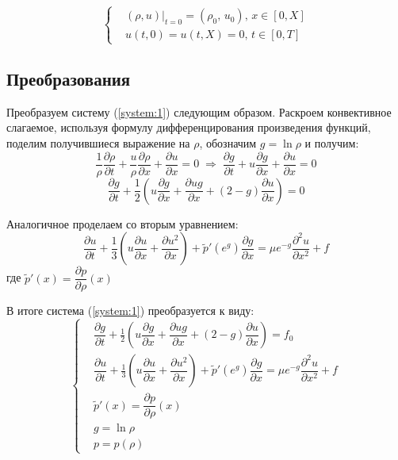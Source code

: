 \begin{equation}
\label{system:2}
\left\{
 \begin{aligned}
  & (\rho, u)|_{t = 0} =
    (\rho_{0}, \,u_{0}), \,  
    x \in [0, X] \\
  & u(t, 0) = u(t, X) = 0, \,
    t \in [0, T] 
 \end{aligned}
\right.
\end{equation}


\subsection{Преобразования}
Преобразуем систему (\ref{system:1}) следующим образом. Раскроем конвективное слагаемое, используя формулу дифференцирования произведения функций, поделим получившиеся выражение на $\rho$, обозначим $g = \ln \rho$ и получим:
$$
  \frac{1}{\rho} \dfrac{\partial \rho}{\partial t} 
  + \frac{u}{\rho} \dfrac{\partial \rho}{\partial x} 
  + \dfrac{\partial u}{\partial x} = 0 
  \;\Rightarrow\;
  \dfrac{\partial g}{\partial t} 
  + u \dfrac{\partial g}{\partial x} 
  + \dfrac{\partial u}{\partial x} = 0 
$$$$
  \dfrac{\partial g}{\partial t} 
  + \frac{1}{2} \left(
    u \dfrac{\partial g}{\partial x} 
    + \dfrac{\partial ug}{\partial x} 
    + (2 - g)\dfrac{\partial u}{\partial x}
  \right) = 0 
$$

Аналогичное проделаем со вторым уравнением:
$$
  \dfrac{\partial u}{\partial t} 
  + \frac{1}{3} \left(
    u \dfrac{\partial u}{\partial x} 
    + \dfrac{\partial u^2}{\partial x} 
  \right) 
  + \tilde{p}'(e^{g}) \dfrac{\partial g}{\partial x} 
  = \mu e^{-g} \dfrac{\partial^2 u}{\partial x^2} + f
$$
где  $\tilde{p}'(x) = \dfrac{\partial p}{\partial \rho}(x)$

В итоге система (\ref{system:1}) преобразуется к виду:
\begin{equation}
\label{system:3}
\left\{
 \begin{aligned}
  & \dfrac{\partial g}{\partial t} 
    + \frac{1}{2} \left(
      u \dfrac{\partial g}{\partial x} 
      + \dfrac{\partial ug}{\partial x} 
      + (2 - g)\dfrac{\partial u}{\partial x}
    \right) = f_0  \\
  & \dfrac{\partial u}{\partial t} 
    + \frac{1}{3} \left(
      u \dfrac{\partial u}{\partial x} 
      + \dfrac{\partial u^2}{\partial x} 
    \right) 
    + \tilde{p}'(e^{g}) \dfrac{\partial g}{\partial x} 
    = \mu e^{-g} \dfrac{\partial^2 u}{\partial x^2} + f \\
  & \tilde{p}'(x) = \dfrac{\partial p}{\partial \rho}(x) \\
  & g = \ln \rho \\
  & p = p (\rho)
 \end{aligned}
\right.
\end{equation}


